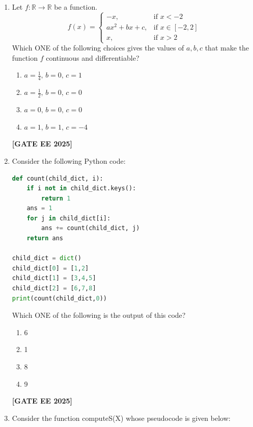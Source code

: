 \documentclass[journal]{IEEEtran}
\newcommand{\qfooter}{%
  \begin{flushright}\footnotesize\textbf{[GATE EE 2025]}\end{flushright}\vspace{1em}%
}
\begin{document}
\begin{enumerate}[leftmargin=*,label=\arabic*.]
\item Let $f:\mathbb{R} \to \mathbb{R}$ be a function.
\[
f(x) =
\begin{cases}
-x, & \text{if } x < -2\\
a x^2 + b x + c, & \text{if } x \in [-2, 2]\\
x, & \text{if } x > 2
\end{cases}
\]
Which ONE of the following choices gives the values of $a, b, c$ that make the function $f$ continuous and differentiable?
\begin{multicols}{2}
\begin{enumerate}[label=(\Alph*)]
\item $a = \frac{1}{4},\, b=0,\, c=1$
\item $a = \frac{1}{2},\, b=0,\, c=0$
\item $a = 0,\, b=0,\, c=0$
\item $a = 1,\, b=1,\, c=-4$
\end{enumerate} \qfooter
\end{multicols}

\item Consider the following Python code:
\begin{lstlisting}[language=Python]
def count(child_dict, i):
    if i not in child_dict.keys():
        return 1
    ans = 1
    for j in child_dict[i]:
        ans += count(child_dict, j)
    return ans

child_dict = dict()
child_dict[0] = [1,2]
child_dict[1] = [3,4,5]
child_dict[2] = [6,7,8]
print(count(child_dict,0))
\end{lstlisting}
Which ONE of the following is the output of this code?
\begin{multicols}{2}
\begin{enumerate}[label=(\Alph*)]
\item 6
\item 1
\item 8
\item 9
\end{enumerate} \qfooter
\end{multicols}

\item Consider the function computeS(X) whose pseudocode is given below:


\end{enumerate}
\end{document}
